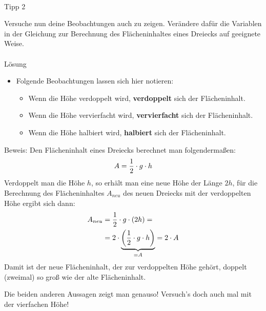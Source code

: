\documentclass[
  ngerman,
]{book}
\providecommand{\tightlist}{%
  \setlength{\itemsep}{0pt}\setlength{\parskip}{0pt}}
\begin{document}
\hypertarget{section-2}{%
\paragraph*{}\label{section-2}}

Tipp 2

Versuche nun deine Beobachtungen auch zu zeigen. Verändere dafür die Variablen in der Gleichung zur Berechnung des Flächeninhaltes eines Dreiecks auf geeignete Weise.

\hypertarget{section-3}{%
\paragraph*{}\label{section-3}}

Lösung

\begin{itemize}
\tightlist
\item
  Folgende Beobachtungen lassen sich hier notieren:

  \begin{itemize}
  \tightlist
  \item
    Wenn die Höhe verdoppelt wird, \textbf{verdoppelt} sich der Flächeninhalt.
  \item
    Wenn die Höhe vervierfacht wird, \textbf{vervierfacht} sich der Flächeninhalt.
  \item
    Wenn die Höhe halbiert wird, \textbf{halbiert} sich der Flächeninhalt.
  \end{itemize}
\end{itemize}

Beweis:
Den Flächeninhalt eines Dreiecks berechnet man folgendermaßen:
\[ A = {1 \over 2} \cdot g \cdot h \]
Verdoppelt man die Höhe \(h\), so erhält man eine neue Höhe der Länge \(2h\), für die Berechnung des Flächeninhaltes \(A_{neu}\) des neuen Dreiecks mit der verdoppelten Höhe ergibt sich dann:
\[\begin{align} A_{neu} &= {1 \over 2} \cdot g \cdot (2h) = \\
&= 2 \cdot \underbrace{\left({1 \over 2} \cdot g \cdot h\right)}_{=A} =  2 \cdot A \end{align}\]
Damit ist der neue Flächeninhalt, der zur verdoppelten Höhe gehört, doppelt (zweimal) so groß wie der alte Flächeninhalt.

Die beiden anderen Aussagen zeigt man genauso! Versuch's doch auch mal mit der vierfachen Höhe!

\hypertarget{section-4}{%
\subsubsection*{}\label{section-4}}
\end{document}
